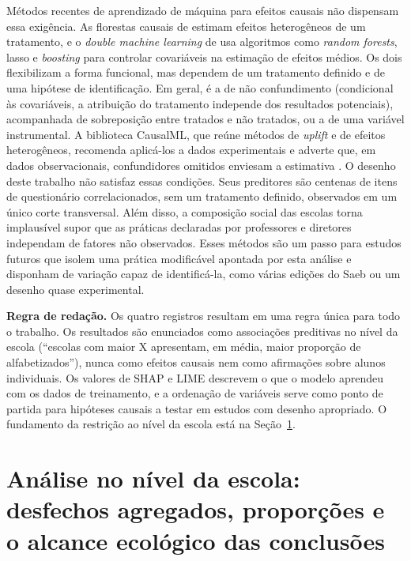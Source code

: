 Métodos recentes de aprendizado de máquina para efeitos causais não
dispensam essa exigência. As florestas causais de
 estimam efeitos heterogêneos de um tratamento,
e o \textit{double machine learning} de 
usa algoritmos como \textit{random forests}, lasso e \textit{boosting} para
controlar covariáveis na estimação de efeitos médios. Os dois flexibilizam
a forma funcional, mas dependem de um tratamento definido e de uma
hipótese de identificação. Em geral, é a de não confundimento (condicional
às covariáveis, a atribuição do tratamento independe dos resultados
potenciais), acompanhada de sobreposição entre tratados e não tratados, ou
a de uma variável instrumental. A biblioteca CausalML, que reúne métodos de
\textit{uplift} e de efeitos heterogêneos, recomenda aplicá-los a dados
experimentais e adverte que, em dados observacionais, confundidores
omitidos enviesam a estimativa \cite{chen2020causalml}. O desenho deste
trabalho não satisfaz essas condições. Seus preditores são centenas de
itens de questionário correlacionados, sem um tratamento definido,
observados em um único corte transversal. Além disso, a composição social
das escolas torna implausível supor que as práticas declaradas por
professores e diretores independam de fatores não observados. Esses
métodos são um passo para estudos futuros que isolem uma prática
modificável apontada por esta análise e disponham de variação capaz de
identificá-la, como várias edições do Saeb ou um desenho quase
experimental.

\textbf{Regra de redação.} Os quatro registros resultam em uma regra
única para todo o trabalho. Os resultados são enunciados como associações
preditivas no nível da escola (``escolas com maior X apresentam, em média,
maior proporção de alfabetizados''), nunca como efeitos causais nem como
afirmações sobre alunos individuais. Os valores de SHAP e LIME descrevem o
que o modelo aprendeu com os dados de treinamento, e a ordenação de
variáveis serve como ponto de partida para hipóteses causais a testar em
estudos com desenho apropriado. O
fundamento da restrição ao nível da escola está na
Seção~\ref{sec:nivel-escola-teoria}.

\section{Análise no nível da escola: desfechos agregados, proporções e o alcance ecológico das conclusões}
\label{sec:nivel-escola-teoria}

